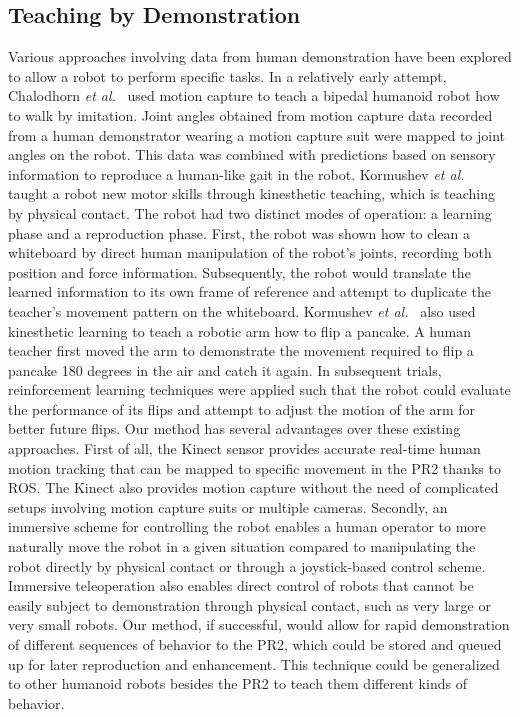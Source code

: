 \documentclass{sig-alternate}
\begin{document}
\subsection{Teaching by Demonstration}
\indent Various approaches involving data from human demonstration have been explored to allow a robot to perform specific tasks. In a relatively early attempt, Chalodhorn \textit{et al.}~\cite{walk_imitation} used motion capture to teach a bipedal humanoid robot how to walk by imitation. Joint angles obtained from motion capture data recorded from a human demonstrator wearing a motion capture suit were mapped to joint angles on the robot. This data was combined with predictions based on sensory information to reproduce a human-like gait in the robot. Kormushev \textit{et al.}~\cite{whiteboard} taught a robot new motor skills through kinesthetic teaching, which is teaching by physical contact. The robot had two distinct modes of operation: a learning phase and a reproduction phase. First, the robot was shown how to clean a whiteboard by direct human manipulation of the robot's joints, recording both position and force information. Subsequently, the robot would translate the learned information to its own frame of reference and attempt to duplicate the teacher's movement pattern on the whiteboard.  Kormushev \textit{et al.}~\cite{pancakes} also used kinesthetic learning to teach a robotic arm how to flip a pancake. A human teacher first moved the arm to demonstrate the movement required to flip a pancake 180 degrees in the air and catch it again. In subsequent trials, reinforcement learning techniques were applied such that the robot could evaluate the performance of its flips and attempt to adjust the motion of the arm for better future flips.
\indent Our method has several advantages over these existing approaches. First of all, the Kinect sensor provides accurate real-time human
motion tracking that can be mapped to specific movement in the PR2 thanks to ROS. The Kinect also provides motion capture without the need
of complicated setups involving motion capture suits or multiple cameras. Secondly, an immersive scheme for controlling the robot
enables a human operator to more naturally move the robot in a given situation compared to manipulating the robot directly by physical
contact or through a joystick-based control scheme. Immersive teleoperation also enables direct control of robots that cannot be easily
subject to demonstration through physical contact, such as very large or very small robots. Our method, if successful, would allow for rapid demonstration of different sequences of behavior to the PR2, which could be stored and queued up for later reproduction and enhancement. This technique could be generalized to other humanoid robots besides the PR2 to teach them different kinds of behavior.
\end{document}
